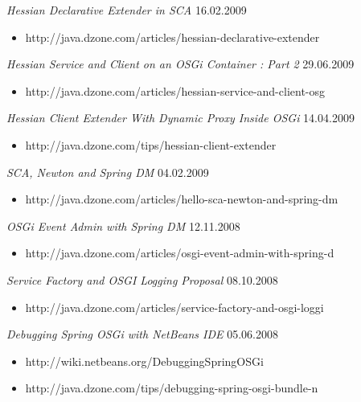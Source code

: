 \documentclass{res}
\begin{document}
\begin{resume}
{\sl Hessian Declarative Extender in SCA}  \hfill   16.02.2009\\
\begin{itemize}
\item[] http://java.dzone.com/articles/hessian-declarative-extender
\end{itemize}

{\sl Hessian Service and Client on an OSGi Container : Part 2}  \hfill   29.06.2009	\\
\begin{itemize}
\item[] http://java.dzone.com/articles/hessian-service-and-client-osg
\end{itemize}

{\sl Hessian Client Extender With Dynamic Proxy Inside OSGi}  \hfill   14.04.2009	\\
\begin{itemize}
\item[] http://java.dzone.com/tips/hessian-client-extender
\end{itemize}

{\sl SCA, Newton and Spring DM}  \hfill    04.02.2009	\\
\begin{itemize}
\item[] http://java.dzone.com/articles/hello-sca-newton-and-spring-dm
\end{itemize}

{\sl OSGi Event Admin with Spring DM}  \hfill   12.11.2008 \\
\begin{itemize}
\item[] http://java.dzone.com/articles/osgi-event-admin-with-spring-d
\end{itemize}

{\sl Service Factory and OSGI Logging Proposal}  \hfill   08.10.2008	\\
\begin{itemize}
\item[] http://java.dzone.com/articles/service-factory-and-osgi-loggi
\end{itemize}

{\sl Debugging Spring OSGi with NetBeans IDE}  \hfill   05.06.2008	\\
\begin{itemize}
\item[] http://wiki.netbeans.org/DebuggingSpringOSGi
\item[] http://java.dzone.com/tips/debugging-spring-osgi-bundle-n
\end{itemize}


\end{resume}
\end{document}
